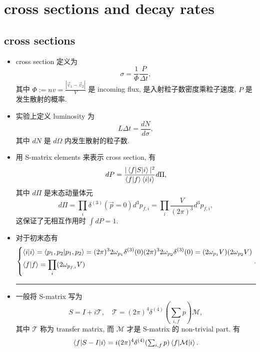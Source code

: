 \chapter{cross sections and decay rates}
\section{cross sections}
\begin{itemize}
	\item cross section 定义为
	\begin{equation} \label{1.1.1}
		\sigma = \frac{1}{\Phi} \frac{P}{\Delta t},
	\end{equation}
	其中 $\Phi := n v = \frac{|\vec{v}_1 - \vec{v}_2|}{V}$ 是 incoming flux, 是入射粒子数密度乘粒子速度, $P$ 是发生散射的概率.
	
	\item 实验上定义 luminosity 为
	\begin{equation}
		L \Delta t = \frac{dN}{d\sigma},
	\end{equation}
	其中 $dN$ 是 $d\Omega$ 内发生散射的粒子数.
	
	\item 用 S-matrix elements 来表示 cross section, 有
	\begin{equation}
		dP = \frac{|\braket{f | S | i}|^2}{\braket{f | f} \braket{i | i}} d\Pi,
	\end{equation}
	其中 $d\Pi$ 是末态动量体元
	\begin{equation}
		d\Pi = \prod_i \delta^{(3)}(\vec{p} = 0) d^3 p_{f, i} = \prod_i \frac{V}{(2 \pi)^3} d^3 p_{f, i},
	\end{equation}
	这保证了无相互作用时 $\int dP = 1$.
	
	\item 对于初末态有
	\begin{equation}
		\begin{dcases}
			\braket{i | i} = \braket{p_1, p_2 | p_1, p_2} = (2 \pi)^3 2 \omega_{p_1} \delta^{(3)}(0) (2 \pi)^3 2 \omega_{p_2} \delta^{(3)}(0) = (2 \omega_{p_1} V) (2 \omega_{p_2} V) \\
			\braket{f | f} = \prod_i (2 \omega_{p_{f, i}} V)
		\end{dcases}.
	\end{equation}
	
	\noindent\rule[0.5ex]{\linewidth}{0.5pt} %
	
	\item 一般将 S-matrix 写为
	\begin{equation}
		S = I + i \mathcal{T}, \quad \mathcal{T} = (2 \pi)^4 \delta^{(4)}({\textstyle \sum_{i, f} p}) \mathcal{M},
	\end{equation}
	其中 $\mathcal{T}$ 称为 transfer matrix, 而 $\mathcal{M}$ 才是 S-matrix 的 non-trivial part. 有
	\begin{equation}
		\braket{f | S - I | i} = i (2 \pi)^4 \delta^{(4)}({\textstyle \sum_{i, f} p}) \braket{f | \mathcal{M} | i}.
	\end{equation}
	

\end{itemize}
